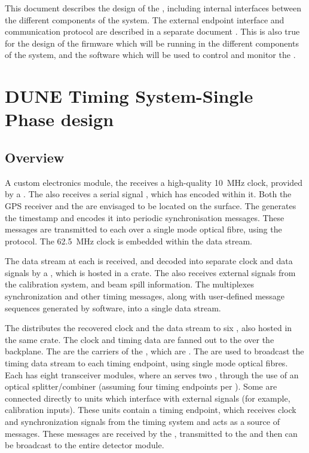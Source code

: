 \documentclass{dune}
\begin{document}
This document describes the design of the , including internal interfaces between the different components of the system. The external endpoint interface and  communication protocol are described in a separate document \cite{dts_sp_protocol}. This is also true for the design of the firmware which will be running in the different components of the system, and the software which will be used to control and monitor the  \cite{dts_sp_firmware}  \cite{dts_sp_software}.

\section{DUNE Timing System-Single Phase design}
\label{sec:system_design}
\subsection{Overview}
A custom electronics module, the  receives a high-quality \SI{10}{\MHz} clock, provided by a . The  also receives a serial  signal \cite{irig}, which has  encoded within it. Both the GPS receiver and the  are envisaged to be located on the surface. The  generates the  timestamp and encodes it into periodic synchronisation messages. These messages are transmitted to each  over a single mode optical fibre, using the  protocol. The \SI{62.5}{\MHz} clock is embedded within the data stream.

The data stream at each  is received, and decoded into separate clock and data signals by a , which is hosted in a  crate. The  also receives external signals from the calibration system, and beam spill information.  The  multiplexes synchronization and other timing messages, along with user-defined message sequences generated by software, into a single data stream. 

The  distributes the recovered clock and the data stream to six , also hosted in the same  crate. The clock and timing data are fanned out to the  over the  backplane. The  are the carriers of the , which are . The  are used to broadcast the timing data stream to each timing endpoint, using single mode optical fibres. Each  has eight  transceiver modules, where an  serves two , through the use of an optical splitter/combiner (assuming four timing endpoints per ). Some  are connected directly to units which interface with external signals (for example, calibration inputs). These  units contain a timing endpoint, which receives clock and synchronization signals from the timing system and acts as a source of  messages. These messages are received by the , transmitted to the  and then can be broadcast to the entire detector module.
\end{document}
